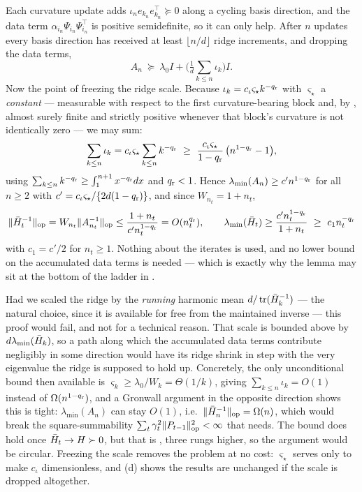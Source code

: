Each curvature update adds $\iota_n e_{k_n}e_{k_n}^{\!\top}\succeq0$ along a cycling basis
direction, and the data term $\alpha_{i_n}\Psi_{i_n}\Psi_{i_n}^{\!\top}$ is positive
semidefinite, so it can only help. After $n$ updates every basis direction has received at least
$\lfloor n/d\rfloor$ ridge increments, and dropping the data terms,
\begin{equation}
A_n\ \succeq\ \lambda_0 I+\Big(\tfrac1d\textstyle\sum_{k\le n}\iota_k\Big)I .
\label{eq:ridgelb}
\end{equation}
Now the point of freezing the ridge scale. Because $\iota_k=c_\iota\varsigma_\star k^{-q_{\mathrm r}}$ with
$\varsigma_\star$ a \emph{constant} --- measurable with respect to the first curvature-bearing
block and, by , almost surely finite and strictly positive whenever that block's
curvature is not identically zero --- we may sum:
\[
\sum_{k\le n}\iota_k=c_\iota\varsigma_\star\sum_{k\le n}k^{-\qr}
\ \ge\ \frac{c_\iota\varsigma_\star}{1-\qr}\,\big(n^{1-\qr}-1\big),
\]
using $\sum_{k\le n}k^{-q_{\mathrm r}}\ge\int_1^{n+1}x^{-q_{\mathrm r}}dx$ and $q_{\mathrm r}<1$. Hence
$\lambda_{\min}(A_n)\ge c'n^{1-q_{\mathrm r}}$ for all $n\ge2$ with
$c'=c_\iota\varsigma_\star/\{2d(1-q_{\mathrm r})\}$, and since $W_{n_t}=1+n_t$,
\[
\opnorm{\Hb_t^{-1}}=W_{n_t}\opnorm{A_{n_t}^{-1}}\le\frac{1+n_t}{c'n_t^{1-\qr}}=O(n_t^{\qr}),
\qquad
\lambda_{\min}(\Hb_t)\ge\frac{c'n_t^{1-\qr}}{1+n_t}\ \ge\ c_1n_t^{-\qr}
\]
with $c_1=c'/2$ for $n_t\ge1$. Nothing about the iterates is used, and no lower bound on the
accumulated data terms is needed --- which is exactly why the lemma may sit at the bottom of the
ladder in .

\begin{remark}
\label{rem:freeze}
Had we scaled the ridge by the \emph{running} harmonic mean $d/\operatorname{tr}(\bar{H}_k^{-1})$ --- the natural
choice, since it is available for free from the maintained inverse --- this proof would fail, and
not for a technical reason. That scale is bounded above by $d\lambda_{\min}(\bar{H}_k)$, so a path
along which the accumulated data terms contribute negligibly in some direction would have its
ridge shrink in step with the very eigenvalue the ridge is supposed to hold up. Concretely, the
only unconditional bound then available is $\varsigma_k\ge\lambda_0/W_k=\Theta(1/k)$, giving
$\sum_{k\le n}\iota_k=O(1)$ instead of $\Omega(n^{1-q_{\mathrm r}})$, and a Gronwall argument in the
opposite direction shows this is tight: $\lambda_{\min}(A_n)$ can stay $O(1)$, i.e.\
$\lVert \bar{H}_n^{-1} \rVert_{\mathrm{op}}=\Omega(n)$, which would break the square-summability
$\sum_t\gamma_t^2\lVert P_{t-1} \rVert_{\mathrm{op}}^2<\infty$ that \Cref{thm:as} needs. The bound does hold once
$\bar{H}_t\to H\succ0$, but that is \Cref{thm:curv}, three rungs higher, so the argument would be
circular. Freezing the scale removes the problem at no cost: $\varsigma_\star$ serves only to
make $c_\iota$ dimensionless, and \Cref{tab:ablation}(d) shows the results are unchanged if the
scale is dropped altogether.
\end{remark}

